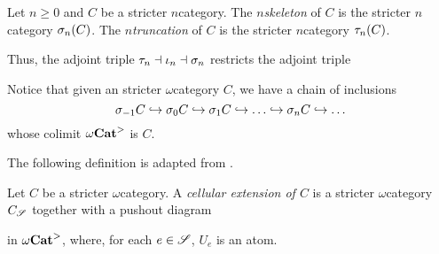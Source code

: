 \begin{dfn}
    Let \( n \geq 0 \) and \( C \) be a stricter \( n \)\nbd category.
    The \emph{\( n \)\nbd skeleton} of \( C \) is the stricter \( n \)\nbd category \( \sigma_{n}(C) \).
    The \emph{\( n \)\nbd truncation} of \( C \) is the stricter \( n \)\nbd category \( \tau_{n}(C) \).
\end{dfn}

\noindent Thus, the adjoint triple \( \tau_{n} \dashv \iota_n \dashv \sigma_{n} \) restricts the adjoint triple
\begin{center}
\end{center}
Notice that given an stricter \( \omega \)\nbd category \( C \), we have a chain of inclusions 
\begin{equation*}
    \sigma_{-1} C \hookrightarrow \sigma_{0} C \hookrightarrow \sigma_{1} C \hookrightarrow \ldots \hookrightarrow \sigma_{n} C \hookrightarrow \ldots
\end{equation*}
whose colimit \( {\omega\mathbf{Cat}}^> \) is \( C \).

The following definition is adapted from \cite[8.2.1]{hadzihasanovic2024combinatorics}.
\begin{dfn}  \label{dfn:cellular_extension}
    Let \( C \) be a stricter \( \omega \)\nbd category.
    A \emph{cellular extension of \( C \)} is a stricter \( \omega \)\nbd category \( C_{\mathscr{S}} \) together with a pushout diagram 
    \begin{center}
    \end{center}
    in \( {\omega\mathbf{Cat}}^> \), where, for each \( e \in \mathscr{S} \), \( U_e \) is an atom.
\end{dfn}

